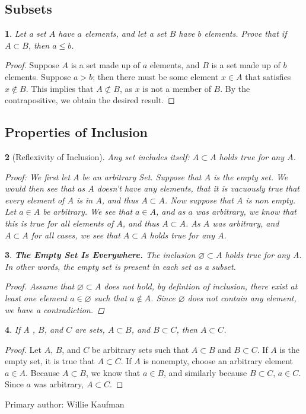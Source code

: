 \documentclass{book}
\renewcommand{\emptyset}{\varnothing}
\newtheorem{majorEx}{}[section]
\begin{document}
			\subsection{Subsets}%
				\begin{majorEx}%
					Let a set $ A $ have $a$ elements, and let a set $B$ have $b$ elements. Prove that if $A \subset B $, then $a\leq b$.
				\end{majorEx}
				\begin{proof}
					Suppose  $ A $ is a set made up of $a$ elements, and $B$ is a set made up of $b$ elements. Suppose $a > b$; then there must be some element $x \in A$ that satisfies $x \notin B$. This implies that $A \not\subset B$, as $x$ is not a member of $B$. By the contrapositive, we obtain the desired result.
				\end{proof}
			\subsection{Properties of Inclusion}%
				\begin{majorEx}[Reflexivity of Inclusion]%
                Any set includes itself: $A \subset A$ holds true for any $A$.

Proof: We first let $A$ be an arbitrary Set. Suppose that $A$ is the empty set. We would then see that as $A$ doesn't have any elements, that it is vacuously true that every element of $A$ is in $A$, and thus  $A \subset A$. Now suppose that $A$ is non empty. Let $a \in A$ be arbitrary. We see that $a \in A$, and as $a$ was arbitrary, we know that this is true for all elements of $A$, and thus $A \subset A$. As $A$ was arbitrary, and $A \subset A$ for all cases, we see that $A \subset A$ holds true for any $A$.
				\end{majorEx}
				\begin{majorEx}%
					\textbf{\textit{The Empty Set Is Everywhere.}} The inclusion $\emptyset \subset A$ holds true for any A. In other words, the empty set is present in each set as a subset.
                    \begin{proof}
                    Assume that $\emptyset \subset A$ does not hold, by defintion of inclusion, there exist at least one element $a \in \emptyset$ such that $a \not\in A$. Since $\emptyset$ does not contain any element, we have a contradiction.
                    \end{proof}
				\end{majorEx}
				\begin{majorEx}%
					If A , $B$, and $C$ are sets, $A \subset B$, and $B \subset C$, then $A \subset C$. 
				\end{majorEx}
                \begin{proof}
                Let $A$, $B$, and $C$ be arbitrary sets such that $A \subset B$ and $B \subset C$. If $A$ is the empty set, it is true that $A \subset C$. If $A$ is nonempty, choose an arbitrary element $a \in A$. Because $A \subset B$, we know that $a \in B$, and similarly because  $B \subset C$, $a \in C$. Since $a$ was arbitrary, $A \subset C$.
                \end{proof}
      		 Primary author: Willie Kaufman
\end{document}
